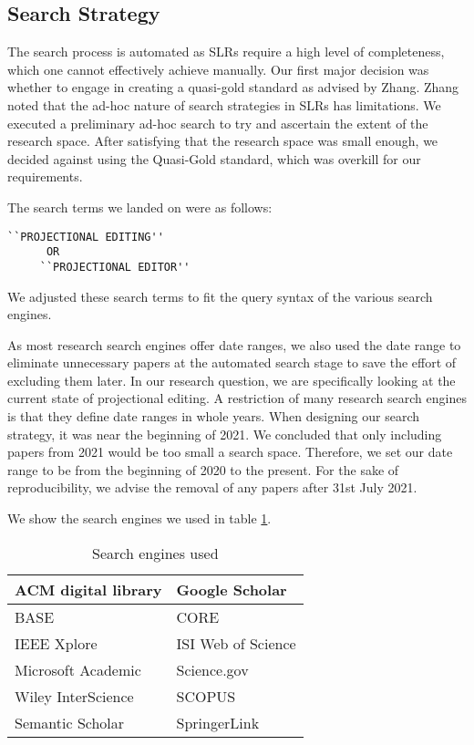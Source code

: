 \subsection{Search Strategy}

The search process is automated as SLRs require a high level of completeness, which one cannot effectively achieve manually.
Our first major decision was whether to engage in creating a quasi-gold standard as advised by Zhang\cite{Zhang_2011}.
Zhang noted that the ad-hoc nature of search strategies in SLRs has limitations.
We executed a preliminary ad-hoc search to try and ascertain the extent of the research space.
After satisfying that the research space was small enough, we decided against using the Quasi-Gold standard, which was overkill for our requirements.

The search terms we landed on were as follows:
\begin{lstlisting}[frame=none]
     ``PROJECTIONAL EDITING'' 
      OR 
     ``PROJECTIONAL EDITOR'' 
\end{lstlisting}

We adjusted these search terms to fit the query syntax of the various search engines.

As most research search engines offer date ranges, we also used the date range to eliminate unnecessary papers at the automated search stage to save the effort of excluding them later.
In our research question, we are specifically looking at the current state of projectional editing.
A restriction of many research search engines is that they define date ranges in whole years.
When designing our search strategy, it was near the beginning of 2021.
We concluded that only including papers from 2021 would be too small a search space. 
Therefore, we set our date range to be from the beginning of 2020 to the present.
For the sake of reproducibility, we advise the removal of any papers after 31st July 2021.

We show the search engines we used in table \ref{table:searchEngines}.

\begin{table}[h]
    \begin{center}         
        \begin{tabular}{|l||l|}
            \hline
            ACM digital library       & Google Scholar       \\
            \hline
            BASE                      & CORE                 \\
            \hline  
            IEEE Xplore               & ISI Web of Science   \\
            \hline  
            Microsoft Academic        & Science.gov          \\
            \hline  
            Wiley InterScience        & SCOPUS               \\
            \hline  
            Semantic Scholar          & SpringerLink         \\
            \hline  
        \end{tabular}
    \end{center}
    \caption{Search engines used}
    \label{table:searchEngines}
\end{table}

